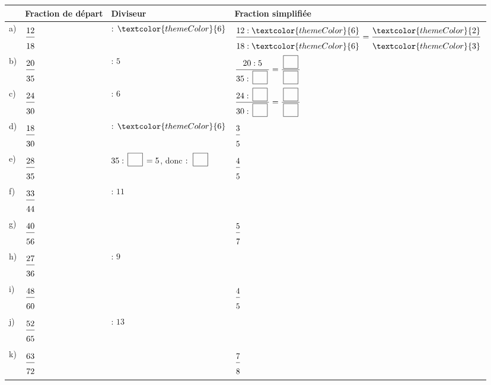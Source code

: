 \def\arraystretch{3}
\begin{tabularx}{\linewidth}{|>{\centering\arraybackslash}p{0.8cm}|>{\centering\arraybackslash}X|>{\centering\arraybackslash}X|>{\centering\arraybackslash}X|}
\hline
\cellcolor{themeNO!30} & \cellcolor{themeNO!30}\textbf{Fraction de départ} & \cellcolor{themeNO!30}\textbf{Diviseur} & \cellcolor{themeNO!30}\textbf{Fraction simplifiée} \\\hline
a) & $\FA{12}{18}$ & $:\, \textcolor{themeColor}{6}$ & $\FA{12 : \textcolor{themeColor}{6}}{18 : \textcolor{themeColor}{6}}=\FA{\textcolor{themeColor}{2}}{\textcolor{themeColor}{3}}$ \\\hline
b) & $\FA{20}{35}$ & $:\, 5$ & $\FA{20 : 5}{35 : \CaseC}=\FA{\CaseC}{\CaseC}$ \\\hline
c) & $\FA{24}{30}$ & $:\, 6$ & $\FA{24 : \CaseC}{30 : \CaseC}=\FA{\CaseC}{\CaseC}$ \\\hline
d) & $\FA{18}{30}$ & $:\, \textcolor{themeColor}{6}$ & $\FA{3}{5}$ \\\hline
e) & $\FA{28}{35}$ & $35 : \CaseC = 5$, donc $:\, \CaseC$ & $\FA{4}{5}$ \\\hline
f) & $\FA{33}{44}$ & $:\, 11$ & \\\hline
g) & $\FA{40}{56}$ & & $\FA{5}{7}$ \\\hline
h) & $\FA{27}{36}$ & $:\, 9$ & \\\hline
i) & $\FA{48}{60}$ & & $\FA{4}{5}$ \\\hline
j) & $\FA{52}{65}$ & $:\, 13$ & \\\hline
k) & $\FA{63}{72}$ & & $\FA{7}{8}$ \\\hline
\end{tabularx}
\def\arraystretch{1}
 
\newpage
{}
 
